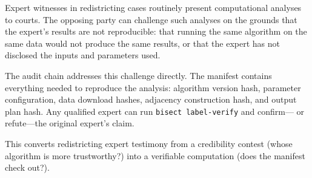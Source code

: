 Expert witnesses in redistricting cases routinely present computational
analyses to courts.
The opposing party can challenge such analyses on the grounds that the
expert's results are not reproducible: that running the same algorithm
on the same data would not produce the same results, or that the expert
has not disclosed the inputs and parameters used.

The \bisect{} audit chain addresses this challenge directly.
The manifest contains everything needed to reproduce the analysis:
algorithm version hash, parameter configuration, data download hashes,
adjacency construction hash, and output plan hash.
Any qualified expert can run \texttt{bisect label-verify} and confirm---
or refute---the original expert's claim.

This converts redistricting expert testimony from a credibility contest
(whose algorithm is more trustworthy?) into a verifiable computation
(does the manifest check out?).
